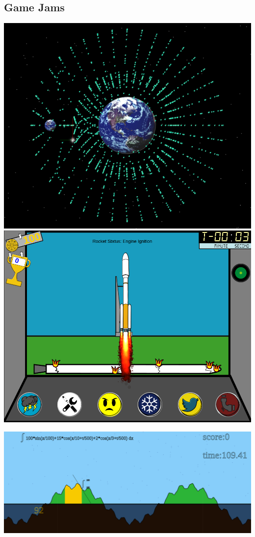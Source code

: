 \documentclass[../r.tex]{subfiles}
\begin{document}
\subsection{Game Jams}
\href{https://github.com/randompast/gravityparticles}{\includegraphics[scale=0.29]{../fun/orbit_hopper.png}}
\href{https://github.com/flyinactor91/Launch-Down}{\includegraphics[scale=0.2]{../fun/liftoff.png}}

\noindent
\includegraphics[scale=0.285]{../fun/startupweekend.png} 
\end{document}
